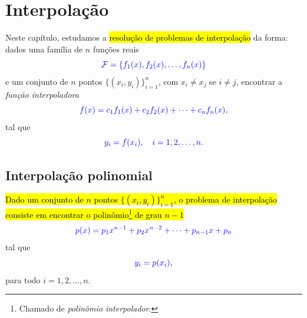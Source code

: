 
\chapter{Interpolação}\label{cap_interp}
\thispagestyle{fancy}

Neste capítulo, estudamos a \hl{resolução de problemas de interpolação} da forma: dados uma família de $n$ funções reais
\begin{equation}\color{blue}\mathcal{F} = \{f_1(x), f_2(x), \dotsc, f_n(x)\}
\end{equation}
e um conjunto de $n$ pontos $\{(x_i, y_i)\}_{i=1}^n$, com $x_i\neq x_j$ se $i\neq j$, encontrar a \emph{função interpoladora}
\begin{equation}\color{blue}f(x) = c_1f_1(x) + c_2f_2(x) + \cdots + c_nf_n(x),
\end{equation}
tal que
\begin{equation}\color{blue}y_i = f(x_i),\quad i=1, 2, \ldots, n.
\end{equation}

\section{Interpolação polinomial}\label{cap_interp_sec_interpoli}

\hl{Dado um conjunto de $n$ pontos $\{(x_i, y_i)\}_{i=1}^n$, o problema de interpolação consiste em encontrar o polinômio\footnote{Chamado de \emph{polinômio interpolador}.} de grau $n-1$}
\begin{equation}\label{cap_interp_sec_interpoli:eq:interpoli_poli}\color{blue}p(x) = p_1x^{n-1} + p_2x^{n-2} + \cdots + p_{n-1}x + p_n
\end{equation}
tal que
\begin{equation}\label{cap_interp_sec_interpoli:eq:interpoli_conds}\color{blue}y_i = p(x_i),
\end{equation}
para todo $i=1, 2, \dotsc, n$.


